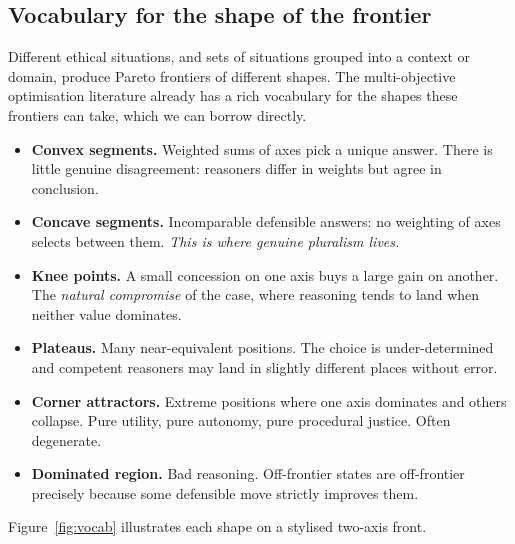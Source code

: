 \documentclass{article}
\begin{document}
\subsection{Vocabulary for the shape of the frontier}
\label{sec:vocab}

Different ethical situations, and sets of situations grouped into a
context or domain, produce Pareto frontiers of different shapes. The
multi-objective optimisation literature already has a rich vocabulary for
the shapes these frontiers can take, which we can borrow directly.

\begin{itemize}[leftmargin=*, itemsep=2pt]
  \item \textbf{Convex segments.} Weighted sums of axes pick a unique answer.
    There is little genuine disagreement: reasoners differ in weights but
    agree in conclusion.
  \item \textbf{Concave segments.} Incomparable defensible answers: no
    weighting of axes selects between them. \emph{This is where genuine
    pluralism lives.}
  \item \textbf{Knee points.} A small concession on one axis buys a large
    gain on another. The \emph{natural compromise} of the case, where
    reasoning tends to land when neither value dominates.
  \item \textbf{Plateaus.} Many near-equivalent positions. The choice is
    under-determined and competent reasoners may land in slightly different
    places without error.
  \item \textbf{Corner attractors.} Extreme positions where one axis
    dominates and others collapse. Pure utility, pure autonomy, pure
    procedural justice. Often degenerate.
  \item \textbf{Dominated region.} Bad reasoning. Off-frontier states are
    off-frontier precisely because some defensible move strictly improves
    them.
\end{itemize}

Figure~\ref{fig:vocab} illustrates each shape on a stylised two-axis front.
\end{document}
